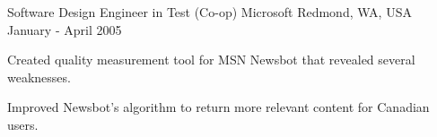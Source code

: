 \begin{cventries}
  \cventry
    {Software Design Engineer in Test (Co-op)} %
    {Microsoft} %
    {Redmond, WA, USA} %
    {January - April 2005} %
    {
      \begin{cvitems} %
        \item {Created quality measurement tool for MSN Newsbot that revealed several weaknesses.}
        \item {Improved Newsbot’s algorithm to return more relevant content for Canadian users.}
      \end{cvitems}
    }

\end{cventries}
